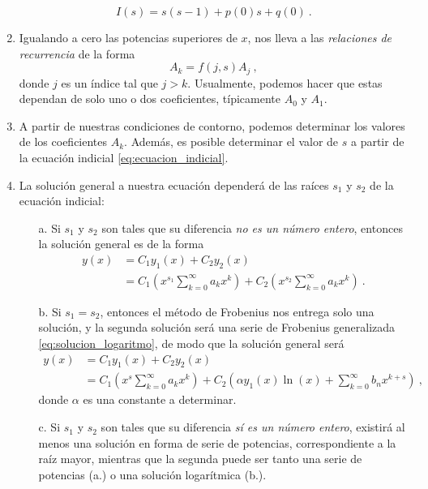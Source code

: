 \begin{propo}
\begin{enumerate}
\begin{equation}
            I(s) = s(s-1) + p(0)s + q(0) \ .
        \end{equation}
        \item Igualando a cero las potencias superiores de $x$, nos lleva a las \emph{relaciones de recurrencia} de la forma
        \begin{equation}
            A_k = f(j,s) A_j \ ,
        \end{equation}
        donde $j$ es un índice tal que $j > k$. Usualmente, podemos hacer que estas dependan de solo uno o dos coeficientes, típicamente $A_0$ y $A_1$.
        \item A partir de nuestras condiciones de contorno, podemos determinar los valores de los coeficientes $A_k$. Además, es posible determinar el valor de $s$ a partir de la ecuación indicial \eqref{eq:ecuacion_indicial}.
        \item La solución general a nuestra ecuación dependerá de las raíces $s_1$ y $s_2$ de la ecuación indicial:
        \begin{itemize}
            \item[a.] Si $s_1$ y $s_2$ son tales que su diferencia \emph{no es un número entero}, entonces la solución general es de la forma
            \begin{align}
                y(x) & = C_1 y_1(x) + C_2 y_2(x) \nonumber \\
                & = C_1 \left( x^{s_1} \sum_{k=0}^\infty a_k x^k \right) + C_2 \left( x^{s_2} \sum_{k=0}^\infty a_k x^k \right)  \ .
            \end{align}
            \item[b.] Si $s_1 = s_2$, entonces el método de Frobenius nos entrega solo una solución, y la segunda solución será una serie de Frobenius generalizada \eqref{eq:solucion_logaritmo}, de modo que la solución general será
            \begin{align}
                y(x) & = C_1 y_1(x) + C_2 y_2(x) \nonumber \\
                & = C_1 \left( x^{s} \sum_{k=0}^\infty a_k x^k \right) + C_2 \left( \alpha y_1(x) \ln(x) + \sum_{k=0}^\infty b_n x^{k+s}  \right) \ ,
            \end{align}
            donde $\alpha$ es una constante a determinar.
            \item[c.] Si $s_1$ y $s_2$ son tales que su diferencia \emph{sí es un número entero}, existirá al menos una solución en forma de serie de potencias, correspondiente a la raíz mayor, mientras que la segunda puede ser tanto una serie de potencias (a.) o una solución logarítmica (b.).  
        \end{itemize}
    \end{enumerate}
\end{propo}

